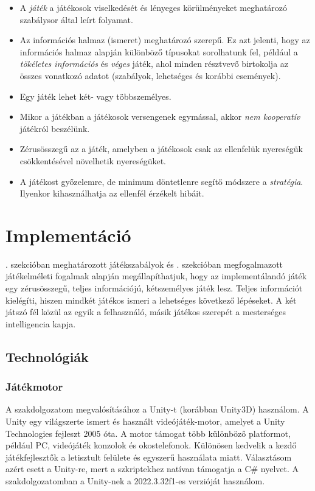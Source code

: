 \documentclass[
]{thesis-ekf}
\theoremstyle{definition}
\theoremstyle{remark}
\begin{document}
\begin{itemize}
	\item A \emph{játék} a játékosok viselkedését és lényeges körülményeket meghatározó szabálysor által leírt folyamat.
	\item Az információs halmaz (ismeret) meghatározó szerepű. Ez azt jelenti, hogy az információs halmaz alapján különböző típusokat sorolhatunk fel, például a \emph{tökéletes információs} és \emph{véges} játék, ahol minden résztvevő birtokolja az összes vonatkozó adatot (szabályok, lehetséges és korábbi események).
	\item Egy játék lehet két- vagy többszemélyes.
	\item Mikor a játékban a játékosok versengenek egymással, akkor \emph{nem kooperatív} játékról beszélünk.
	\item Zérusösszegű az a játék, amelyben a játékosok csak az ellenfelük nyereségük csökkentésével növelhetik nyereségüket.
	\item A játékost győzelemre, de minimum döntetlenre segítő módszere a \emph{stratégia}. Ilyenkor kihasználhatja az ellenfél érzékelt hibáit.
\end{itemize} 

\chapter{Implementáció} \label{implementation}

. szekcióban meghatározott játékszabályok és . szekcióban megfogalmazott játékelméleti fogalmak alapján megállapíthatjuk, hogy az implementálandó játék egy zérusösszegű, teljes információjú, kétszemélyes játék lesz. Teljes információt kielégíti, hiszen mindkét játékos ismeri a lehetséges következő lépéseket. A két játszó fél közül az egyik a felhasználó, másik játékos szerepét a mesterséges intelligencia kapja.

\section{Technológiák}

\subsection{Játékmotor}

A szakdolgozatom megvalósításához a Unity-t (korábban Unity3D) használom. A Unity egy világszerte ismert és használt videójáték-motor, amelyet a Unity Technologies fejleszt 2005 óta. A motor támogat több különböző platformot, például PC, videójáték konzolok és okostelefonok. Különösen kedvelik a kezdő játékfejlesztők a letisztult felülete és egyszerű használata miatt. Választásom azért esett a Unity-re, mert a szkriptekhez natívan támogatja a C\# nyelvet. A szakdolgozatomban a Unity-nek a 2022.3.32f1-es verzióját használom.
\end{document}

